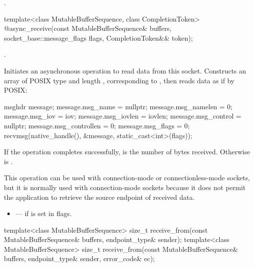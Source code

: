 \begin{itemdescr}
\pnum
\returns {}.
\end{itemdescr}

\begin{itemdecl}
template<class MutableBufferSequence, class CompletionToken>
  @\DEDUCED@ async_receive(const MutableBufferSequence& buffers,
                        socket_base::message_flags flags,
                        CompletionToken&& token);
\end{itemdecl}

\begin{itemdescr}
\pnum
\completionsig {}.

\pnum
\effects Initiates an asynchronous operation to read data from this socket. Constructs an array  of POSIX type  and length , corresponding to , then reads data as if by POSIX:
\begin{codeblock}
msghdr message;
message.msg_name = nullptr;
message.msg_namelen = 0;
message.msg_iov = iov;
message.msg_iovlen = iovlen;
message.msg_control = nullptr;
message.msg_controllen = 0;
message.msg_flags = 0;
recvmsg(native_handle(), &message, static_cast<int>(flags));
\end{codeblock}


\pnum
If the operation completes successfully,  is the number of bytes received. Otherwise  is .

\pnum
 \begin{note} This operation can be used with connection-mode or connectionless-mode sockets, but it is normally used with connection-mode sockets because it does not permit the application to retrieve the source endpoint of received data. \end{note}

\pnum
\errors
\begin{itemize}
\item
{} --- if  is set in flags.
\end{itemize}
\end{itemdescr}

\begin{itemdecl}
template<class MutableBufferSequence>
  size_t receive_from(const MutableBufferSequence& buffers,
                      endpoint_type& sender);
template<class MutableBufferSequence>
  size_t receive_from(const MutableBufferSequence& buffers,
                      endpoint_type& sender, error_code& ec);
\end{itemdecl}

